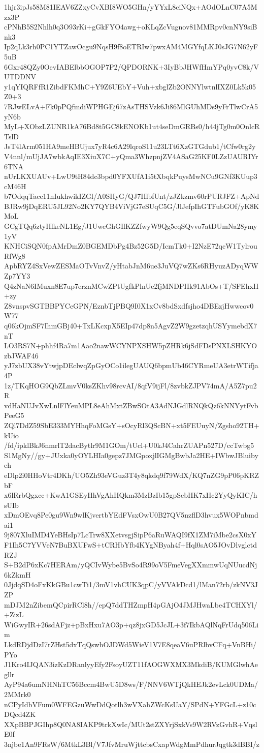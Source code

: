 1hjr3ipJs58M81IEAV6ZZxyCvXBI8WO5GHn/yYYxL8ciNQx+AOdOLnC07A5Mzx3P
cPNhB5S2Nhlh0q3O93rKi+gGkFYO4awg+oKLqZcVugnov81MMRpv0cnNY9siBnk3
Ip2qLk3rh0PC1YTZawOcgu9NqsH9f8oETRIw7pwxAM4MGYfqLKJ0sJG7N62yF5uB
6Gxr48QZy0OevIABElbbOGOP7P2/QPDORNK+3IyBbJHWfHmYPq0yvC8k/VUTDDNV
y1qYIQRFfR1ZibdFKMhC+Y9Z6UEbY+Vuh+xbglZb2ONNYlwtnlIXZ0Lk5k05Z0+3
7RJwELvA+Fk0pPQfmdiWPHGEj67zAsTHSVzk6Ji86MlGUhMDs9yFrTlwCrA5yN6b
MyL+XObzLZUNR1kA76Bd8t5GC8kENOKb1ut4seDmGRBs0/h44jTg0m0OnlcRTslD
JsT4lArm051HA9meHBUjux7yR4c6A29lqroS11u23LTt6XzGTGdub1/tCfw0rg2y
V4nnl/mUjJA7wbkAqIE3XiuX7C+yQma3WhzpnjZV4ASaG25KF0LZzUAURIYr6TNA
nUrLKXUAUv+LwU9tH84dc3bpd0YFXUfA1i5tXbqkPuysMwNCu9GNf3KUup3cM46H
b7OdqqTace11nIukhwikIZGl/A0SHyG/QJ7HlbfUnt/zJZkzmv60rPURJFZ+ApNd
BJRw9jDqERU5JL92No2KY7QYB4ViVjG7eSUqC5G/JlJefpIhGTFubGOf/yK8KMoL
GCgTQq6ztyHlkeNL1Eg/J1UweGhGIlKZZfwyW9Qg5eqSQvvo7atDUmNa28ymy1yV
KNHCiSQN0fpAMrDmZ0BGEMDbPg4Bz52G5D/IcmTk0+I2NzE72qcW1TylrouRfWg8
ApbRYZ4SxVewZESMaOTvVnvZ/yHtabJnM6ue3JuVQ7wZKs6RHyuzADyqWWZp7YY3
Q4zNaN6IMuxn8E7up7erznMCwZPtUgfkPlnUe2fjMNDPHk91AbOs+T/SFEhxH+zy
Z8vnspvSGTBBPYCeGPN/EznbTjPBQ9I0X1xCv8bdSxdfsjho4DBEzjHwwcov0W77
q06kOjmSF7IhmGBj40+TxLKcxpX5EIp47dp8n5AgvZ2W9gzetzqhUSYymebdX7nT
LO3RS7N+phhf4Ra7m1Aao2nawWCYNPXSHW5pZHRk6jSdFDsPNXLSHKYOzbJWAF46
yJ7zbUX38vYtwjpDEclwqZpGyOCo1ilegUAUQ6bpmUb46CYRmeUA3etrWTifja4P
1z/TKqHOG9QbZLmvV0ksZKhv98rcvAI/8qfV9ijFl/8zvbkZJPV74mA/A5Z7pu2R
vdHaNUJvXwLnlFlYeuMPL8eAhMxtZBwSOtA3AdNJGdlRNQkQz6kNNYytFvbPeeG5
ZQl7DdZ59SbE333MYHhqFoMGsY+sOcyRl3QScBN+xt5FEUuyN/Zgsho92TH+kUio
/fd/ipklBkJ6nmrlT2dacBytlr9M1GOm/tUcl+U0kJ4CahrZUAPn527D/ccTwbg5
S1MgNy//gy+JUxka0yOYLHIa0gepz7JMGpoxjlIGMgBwbJa2HE+IWbwJBluibyeh
eDlp2i0HHoVtr4DKh/UO5Zh93eVGuz3T4y8qkdq9f79WdX/KQ7nZG9pP06pKRZbF
x6lRrbQgxcc+KwA1GSEyHhVgAhHQkm3MzBzIb15gpSebHK7xHc2YyQyKIC/hsUIb
xDmOEvq8Pe0gu9Wn9wlKjvertbYEdFVsxOwU0B27QV5nzflD3hvux5WOPnbmdai1
9j807XluIMD4YeBHsIp7LcTrw8XXetvsgjSipP6aRuWAQI9fX1ZM7iMbe2csX0xY
F1Ih5C7YVVeN7BuBXUFwS+tCRHbYfb4KYgNByah4f+Hql0sAO5JOvDlvglctdRZJ
S+B2dP6xKc7HERAm/yQCIvWybe5BvSo4R99oV5FmeVegXXmmwUqNUucdNj6kZkmH
0JjdqSD4oFxKkGBu1cwTi1/3mV1vhCUK3qpC/yVVAkDcd1/lMan72rb/zkNV3JZP
mDJM2nZibemQCpirRCl8h//epQ7ddTHZmpH4pGAjO4JMJHwaLbe4TCHXYl/+ZizL
WiGwyIR+26sdAFjz+pBxHxu7AO3p+qz8jxGD5JcJL+3f7IkbAQlNqFrUdq506Lim
LkdRDjdDzI7rZHst5dxTqQswhOJDWd5WieV1V7E8qeaV6uPRlbvCFq+VnBHi/PYo
J1Kro4IJQAN3izKzDRanlyyEfy2FsoyUZT11fAOGWXMX3MkdiB/KUMGlwhAegllr
AyP94a6umNHNhTC56Bccm4BwU5D8ws/F/NNV6WTjQkHEJk2evLck0UDMa/2MMrk0
nCPyIdbVFum0WFEGzuWwDdQotlh3wVXahZWcKsUaY/SPdN+YFGcL+z10cDQcd4ZK
XXpBBPJGIhp8Q0NA8IAKP9trkXwIc/MUt2stZXYrjSxkVs9W2RVzGvhR+VqslE0f
3njbe1An9FRsW/6MtkL3Bl/V7JfvMruWjttcbsCxapWdgMmPdhurJqgtk3dBBI/z
